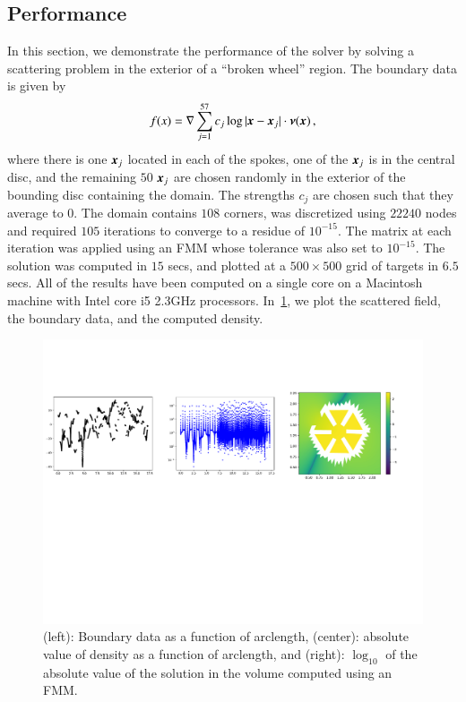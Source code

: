 \subsection{Performance}
In this section, we demonstrate the performance of the solver by solving a scattering problem in the
exterior of a ``broken wheel'' region. The boundary data is given by
\begin{equation}
f(x) = \nabla  \sum_{j=1}^{57} c_{j} \log| \boldsymbol{x} - \boldsymbol{x}_{j}| \cdot \boldsymbol{\nu}(\boldsymbol{x}) \, , 
\end{equation}
where there is one $\boldsymbol{x}_{j}$ located in each of the spokes, one of the $\boldsymbol{x}_{j}$ is in the central disc, and the remaining $50$ $\boldsymbol{x}_{j}$ are chosen randomly in the exterior of the bounding disc containing the domain. The strengths $c_{j}$ are chosen such that they average to $0$. The domain contains $108$ corners, was discretized using $22240$ nodes and required $105$ iterations to converge to a residue of $10^{-15}$. The matrix at each iteration was applied using an FMM whose tolerance was also set to $10^{-15}$. The solution was computed in $15$ secs, and plotted at a $500\times 500$ grid of targets in $6.5$ secs. All of the results have been computed on a single core on a Macintosh machine with Intel core i5 2.3GHz processors. In~\cref{fig:magnetron}, we plot the scattered field, the boundary data, and the computed density.


\begin{figure}
\begin{center}
\includegraphics[width=\linewidth]{paper-figs/magnetron}
\caption{(left): Boundary data as a function of arclength, (center): absolute value of density as a function of arclength, and 
(right): $\log_{10}$ of the absolute value of the solution in the volume computed using an FMM.}
\label{fig:magnetron}
\end{center}
\end{figure}
